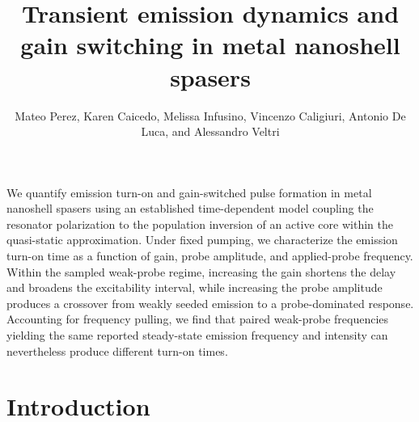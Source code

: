 \documentclass{optica-article}
\begin{document}
\title{Transient emission dynamics and gain switching in metal nanoshell spasers}

\author{Mateo Perez, Karen Caicedo,  Melissa Infusino, Vincenzo Caligiuri, Antonio De Luca, and Alessandro Veltri}

\address{Colegio de Ciencias e Ingenier\'ia, Universidad San Francisco de Quito, Quito, Ecuador\\
Istituto di Scienze Applicate e Sistemi Intelligenti (ISASI), Consiglio Nazionale delle Ricerche, Napoli, Italy\\
Istituto per i Processi Chimico-Fisici (IPCF), Consiglio Nazionale delle Ricerche, Messina, Italy\\
Department of Physics, University of Calabria, via P. Bucci 31c, 87036 Rende (CS), Italy}



\begin{abstract*}
We quantify emission turn-on and gain-switched pulse formation in metal nanoshell spasers using an established time-dependent model coupling the resonator polarization to the population inversion of an active core within the quasi-static approximation. Under fixed pumping, we characterize the emission turn-on time as a function of gain, probe amplitude, and applied-probe frequency. Within the sampled weak-probe regime, increasing the gain shortens the delay and broadens the excitability interval, while increasing the probe amplitude produces a crossover from weakly seeded emission to a probe-dominated response. Accounting for frequency pulling, we find that paired weak-probe frequencies yielding the same reported steady-state emission frequency and intensity can nevertheless produce different turn-on times. 
\end{abstract*}

\section{Introduction}
\label{sec:intro}
\end{document}
